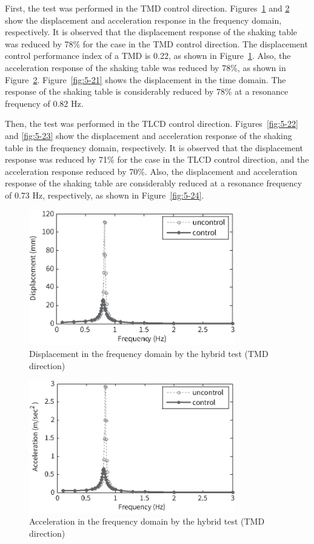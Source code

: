 First, the test was performed in the TMD control direction. Figures~\ref{fig:5-19} and \ref{fig:5-20} show the displacement and acceleration response in the frequency domain, respectively. It is observed that the displacement response of the shaking table was reduced by 78\% for the case in the TMD control direction. The displacement control performance index of a TMD is 0.22, as shown in Figure~\ref{fig:5-19}. Also, the acceleration response of the shaking table was reduced by 78\%, as shown in Figure~\ref{fig:5-20}. Figure~\ref{fig:5-21} shows the displacement in the time domain. The response of the shaking table is considerably reduced by 78\% at a resonance frequency of 0.82 Hz.

Then, the test was performed in the TLCD control direction. Figures~\ref{fig:5-22} and \ref{fig:5-23} show the displacement and acceleration response of the shaking table in the frequency domain, respectively. It is observed that the displacement response was reduced by 71\% for the case in the TLCD control direction, and the acceleration response reduced by 70\%. Also, the displacement and acceleration response of the shaking table are considerably reduced at a resonance frequency of 0.73 Hz, respectively, as shown in Figure~\ref{fig:5-24}.

\begin{figure}[ht]
\centering
\includegraphics[width=0.8\textwidth] {figure/5-19.eps}
\caption{Displacement in the frequency domain by the hybrid test (TMD direction)}
\label{fig:5-19}
\end{figure}

\begin{figure}[ht]
\centering
\includegraphics[width=0.8\textwidth] {figure/5-20.eps}
\caption{Acceleration in the frequency domain by the hybrid test (TMD direction)}
\label{fig:5-20}
\end{figure}

